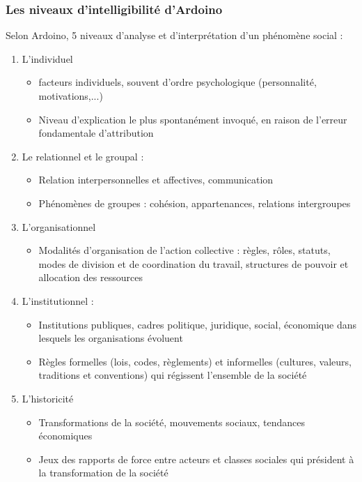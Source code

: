\documentclass[12pt]{beamer}
\begin{document}
  \begin{frame}[allowframebreaks]
      \frametitle{Les niveaux d'intelligibilité d'Ardoino}
      Selon Ardoino, 5 niveaux d'analyse et d'interprétation d'un phénomène social :
      
      \begin{enumerate}
       \item L'individuel
	    \begin{itemize}
	     \item facteurs individuels, souvent d'ordre psychologique (personnalité, motivations,...)
	     \item Niveau d'explication le plus spontanément invoqué, en raison de l'erreur fondamentale d'attribution
	    \end{itemize}
      \item Le relationnel et le groupal :
	  \begin{itemize}
	   \item Relation interpersonnelles et affectives, communication
	   \item Phénomènes de groupes : cohésion, appartenances, relations intergroupes
	  \end{itemize}
      \item L'organisationnel
	  \begin{itemize}
	   \item Modalités d'organisation de l'action collective : règles, rôles, statuts, modes de division et de coordination du travail, structures de pouvoir et allocation des ressources
	  \end{itemize}
      \framebreak
      \item L'institutionnel :
	  \begin{itemize}
	   \item Institutions publiques, cadres politique, juridique, social, économique dans lesquels les organisations évoluent
	   \item Règles formelles (lois, codes, règlements) et informelles (cultures, valeurs, traditions et conventions) qui régissent l'ensemble de la société
	  \end{itemize}
      \item L'historicité
	  \begin{itemize}
	   \item Transformations de la société, mouvements sociaux, tendances économiques
	   \item Jeux des rapports de force entre acteurs et classes sociales qui président à la transformation de la société
	  \end{itemize}

      \end{enumerate}
  \end{frame}
    
\end{document}

